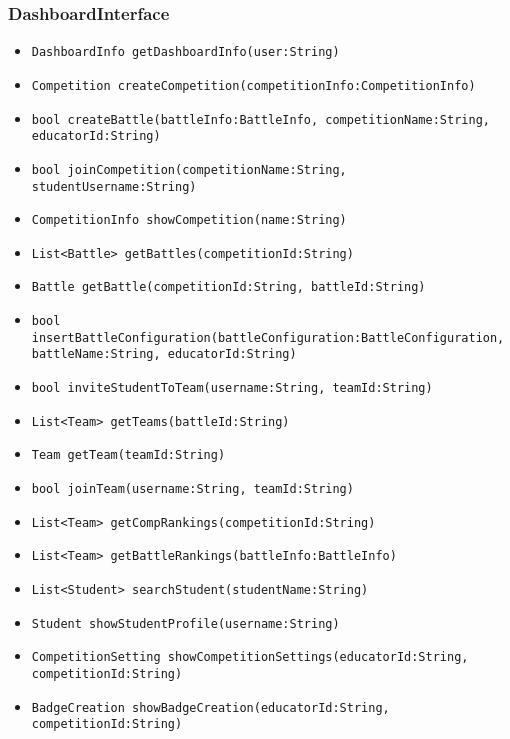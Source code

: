 \subsubsection{DashboardInterface}
\begin{itemize}
    \item \texttt{DashboardInfo getDashboardInfo(user:String)}%
    \item \texttt{Competition createCompetition(competitionInfo:CompetitionInfo)}%
    \item \texttt{bool createBattle(battleInfo:BattleInfo, competitionName:String,\\educatorId:String)}%
    \item \texttt{bool joinCompetition(competitionName:String, studentUsername:String)}%
    \item \texttt{CompetitionInfo showCompetition(name:String)}%
    \item \texttt{List<Battle> getBattles(competitionId:String)}%
    \item \texttt{Battle getBattle(competitionId:String, battleId:String)}
    \item \texttt{bool insertBattleConfiguration(battleConfiguration:BattleConfiguration, battleName:String, educatorId:String)}%
    \item \texttt{bool inviteStudentToTeam(username:String, teamId:String)}%
    \item \texttt{List<Team> getTeams(battleId:String)}%
    \item \texttt{Team getTeam(teamId:String)}%
    \item \texttt{bool joinTeam(username:String, teamId:String)}%
    \item \texttt{List<Team> getCompRankings(competitionId:String)}
    \item \texttt{List<Team> getBattleRankings(battleInfo:BattleInfo)}
    \item \texttt{List<Student> searchStudent(studentName:String)}%
    \item \texttt{Student showStudentProfile(username:String)}%
    \item \texttt{CompetitionSetting showCompetitionSettings(educatorId:String,\\competitionId:String)}%
    \item \texttt{BadgeCreation showBadgeCreation(educatorId:String, competitionId:String)}%

\end{itemize}
